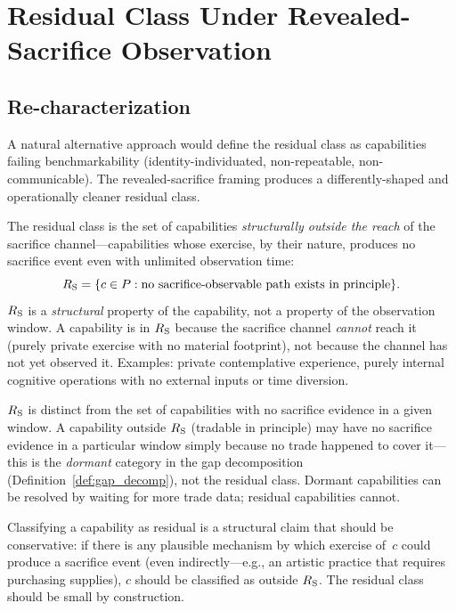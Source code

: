 \section{Residual Class Under Revealed-Sacrifice Observation}
\label{sec:residual_class}

\subsection{Re-characterization}

A natural alternative approach would define the residual class as
capabilities failing benchmarkability (identity-individuated,
non-repeatable, non-communicable).  The revealed-sacrifice framing
produces a differently-shaped and operationally cleaner residual
class.

\begin{definition}
\label{def:residual_class}
The residual class is the set of capabilities \emph{structurally
outside the reach} of the sacrifice channel---capabilities whose
exercise, by their nature, produces no sacrifice event even with
unlimited observation time:
\[
  R_{\mathrm{S}} = \{c \in P : \text{no sacrifice-observable path exists
  in principle}\}.
\]
$R_{\mathrm{S}}$ is a \emph{structural} property of the capability, not a
property of the observation window.  A capability is in $R_{\mathrm{S}}$
because the sacrifice channel \emph{cannot} reach it (purely
private exercise with no material footprint), not because the
channel has not yet observed it.  Examples: private contemplative
experience, purely internal cognitive operations with no external
inputs or time diversion.
\end{definition}

\begin{remark}
$R_{\mathrm{S}}$ is distinct from the set of capabilities with no sacrifice
evidence in a given window.  A capability outside $R_{\mathrm{S}}$
(tradable in principle) may have no sacrifice evidence in a
particular window simply because no trade happened to cover
it---this is the \emph{dormant} category in the gap decomposition
(Definition~\ref{def:gap_decomp}), not the residual class.
Dormant capabilities can be resolved by waiting for more trade
data; residual capabilities cannot.
\end{remark}

\begin{remark}
\label{rem:residual_conservatism}
Classifying a capability as residual is a structural claim that
should be conservative: if there is any plausible mechanism by
which exercise of~$c$ could produce a sacrifice event (even
indirectly---e.g., an artistic practice that requires purchasing
supplies), $c$ should be classified as outside $R_{\mathrm{S}}$.  The
residual class should be small by construction.
\end{remark}

